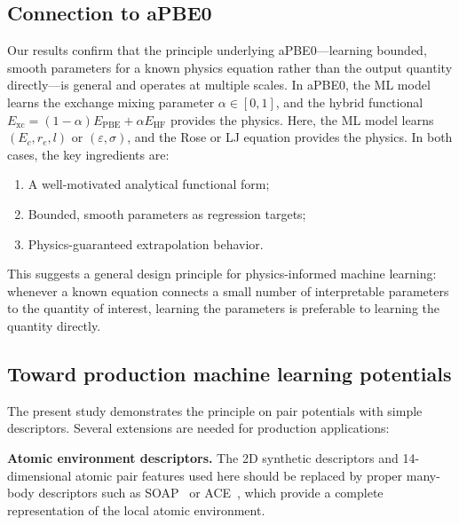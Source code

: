 \documentclass[aps,prb,twocolumn,superscriptaddress,longbibliography,floatfix]{revtex4-2}
\begin{document}
\subsection{Connection to aPBE0}
\label{sec:apbe0}

Our results confirm that the principle underlying aPBE0---learning bounded, smooth parameters for a known physics equation rather than the output quantity directly---is general and operates at multiple scales. In aPBE0, the ML model learns the exchange mixing parameter $\alpha \in [0, 1]$, and the hybrid functional $E_\mathrm{xc} = (1-\alpha)E_\mathrm{PBE} + \alpha E_\mathrm{HF}$ provides the physics. Here, the ML model learns $(E_c, r_e, l)$ or $(\varepsilon, \sigma)$, and the Rose or LJ equation provides the physics. In both cases, the key ingredients are:
\begin{enumerate}
  \item A well-motivated analytical functional form;
  \item Bounded, smooth parameters as regression targets;
  \item Physics-guaranteed extrapolation behavior.
\end{enumerate}

This suggests a general design principle for physics-informed machine learning: whenever a known equation connects a small number of interpretable parameters to the quantity of interest, learning the parameters is preferable to learning the quantity directly.

\subsection{Toward production machine learning potentials}
\label{sec:outlook}

The present study demonstrates the principle on pair potentials with simple descriptors. Several extensions are needed for production applications:

\textbf{Atomic environment descriptors.} The 2D synthetic descriptors and 14-dimensional atomic pair features used here should be replaced by proper many-body descriptors such as SOAP~\cite{Bartok2010,Musil2021} or ACE~\cite{Drautz2019}, which provide a complete representation of the local atomic environment.
\end{document}
